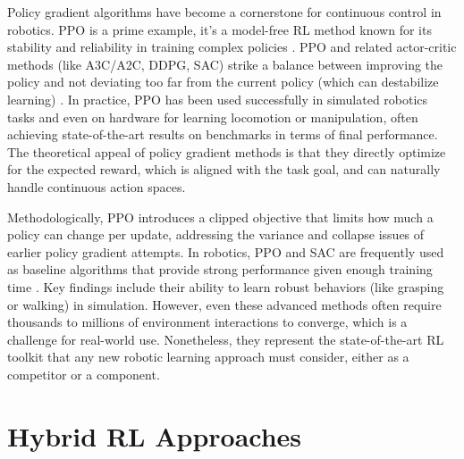Policy gradient algorithms have become a cornerstone for continuous control in robotics. \ac{PPO} is a prime example, it's a model-free \ac{RL} method known for its stability and reliability in training complex policies \cite{PPO2017, IREVLA2025}. \ac{PPO} and related actor-critic methods (like \ac{A3C}/\ac{A2C}, \ac{DDPG}, \ac{SAC}) strike a balance between improving the policy and not deviating too far from the current policy (which can destabilize learning) \cite{A3C2016, DDPG2015, SAC2018}. In practice, \ac{PPO} has been used successfully in simulated robotics tasks and even on hardware for learning locomotion or manipulation, often achieving state-of-the-art results on benchmarks in terms of final performance. The theoretical appeal of policy gradient methods is that they directly optimize for the expected reward, which is aligned with the task goal, and can naturally handle continuous action spaces.

Methodologically, \ac{PPO} introduces a clipped objective that limits how much a policy can change per update, addressing the variance and collapse issues of earlier policy gradient attempts. In robotics, \ac{PPO} and \ac{SAC} are frequently used as baseline algorithms that provide strong performance given enough training time \cite{PPO2017, SAC2018}. Key findings include their ability to learn robust behaviors (like grasping or walking) in simulation. However, even these advanced methods often require thousands to millions of environment interactions to converge, which is a challenge for real-world use. Nonetheless, they represent the state-of-the-art \ac{RL} toolkit that any new robotic learning approach must consider, either as a competitor or a component.



\section{Hybrid RL Approaches}

